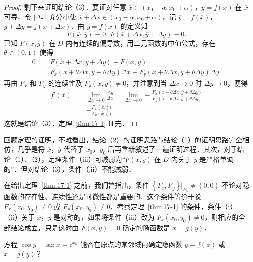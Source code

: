 \begin{proof}
剩下来证明结论（3）．要证对任意 $\overline{x}\in(x_{0}-\alpha,x_{0}+\alpha)$，$y=f(x)$ 在 $\overline{x}$ 可导．令 $\left|\Delta x\right|$ 充分小使 $\overline{x}+\Delta x\in(x_{0}-\alpha,x_{0}+\alpha)$，记 $\overline{y}=f(\overline{x})$，$\overline{y}+\Delta y=f(\overline{x}+\Delta x)$．由 $y=f(x)$ 的定义知
\[
F(\overline{x},\overline{y})=0,\ F(\overline{x}+\Delta x,\overline{y}+\Delta y)=0.
\]
已知 $F(x,y)$ 在 $D$ 内有连续的偏导数，用二元函数的中值公式，存在 $\theta\in(0,1)$ 使得
\[
\begin{aligned}
0&=F(\overline{x}+\Delta x,\overline{y}+\Delta y)-F(\overline{x},\overline{y})\\
&=F_{x}(\overline{x}+\theta\Delta x,\overline{y}+\theta\Delta y)\Delta x+F_{y}(\overline{x}+\theta\Delta x,\overline{y}+\theta\Delta y)\Delta y.
\end{aligned}
\]
再由 $F_{x}$ 和 $F_{y}$ 的连续性及 $F_{y}(x,y)\neq0$，并注意到当 $\Delta x\to0$ 时 $\Delta y\to0$，便得
\[
\begin{aligned}
f'(\overline{x})&=\lim_{\Delta x\to0}\frac{\Delta y}{\Delta x}=\lim_{\Delta x\to0}-\frac{F_{x}(\overline{x}+\theta\Delta x,\overline{y}+\theta\Delta y)}{F_{y}(\overline{x}+\theta\Delta x,\overline{y}+\theta\Delta y)}\\
&=-\frac{F_{x}(\overline{x},\overline{y})}{F_{y}(\overline{x},\overline{y})}.
\end{aligned}
\]
这就是结论（3）．定理~\ref{thm:17-1} 证完．
\end{proof}

回顾定理的证明，不难看出，结论（2）的证明思路与结论（1）的证明思路完全相仿，几乎是将 $\overline{x}$，$\overline{y}$ 代替了 $x_{0}$，$y_{0}$ 后再重新叙述了一遍证明过程．其次，对于结论（1）、（2），定理条件（iii）可减弱为``$F(x,y)$ 在 $D$ 内关于 $y$ 是严格单调的''．但对结论（3），条件（iii）不能减弱．

在给出定理~\ref{thm:17-1} 之前，我们曾指出，条件 $\left\{F_{x},F_{y}\right\}\big|_{P_{0}}\neq\left\{0,0\right\}$ 不论对隐函数的存在性、连续性还是可微性都是重要的．这个条件等价于说 $F_{x}(x_{0},y_{0})\neq0$ 或 $F_{y}(x_{0},y_{0})\neq0$．考察定理~\ref{thm:17-1} 的条件，条件（i），（ii）关于 $x$，$y$ 是对称的，如果将条件（iii）改为 $F_{x}(x_{0},y_{0})\neq0$，则相应的全部结论成立，只是这时由 $F(x,y)=0$ 确定的隐函数是 $x=g(y)$．

\begin{example}\label{ex:17-1-1}
方程 $\cos y+\sin x=\mathrm{e}^{xy}$ 能否在原点的某邻域内确定隐函数 $y=f(x)$ 或 $x=g(y)$？
\end{example}

